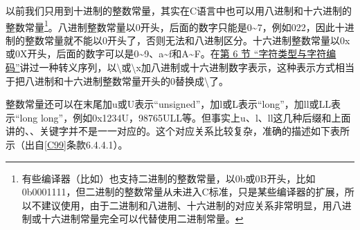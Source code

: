 以前我们只用到十进制的整数常量，其实在C语言中也可以用八进制和十六进制的整数常量\footnote[26]{有些编译器（比如）也支持二进制的整数常量，以0b或0B开头，比如0b0001111，但二进制的整数常量从未进入C标准，只是某些编译器的扩展，所以不建议使用，由于二进制和八进制、十六进制的对应关系非常明显，用八进制或十六进制常量完全可以代替使用二进制常量。}。八进制整数常量以0开头，后面的数字只能是0\textasciitilde{}\BookSplit{}7，例如022，因此十进制的整数常量就不能以0开头了，否则无法和八进制区分。十六进制整数常量以0x或0X开头，后面的数字可以是0\textasciitilde{}\BookSplit{}9、a\textasciitilde{}\BookSplit{}f和A\textasciitilde{}\BookSplit{}F。在\hyperlink{db.ch02s06.id2709590}{第 6 节 “字符类型与字符编码”}讲过一种转义序列，以\textbackslash{}或\textbackslash{}x加八进制或十六进制数字表示，这种表示方式相当于把八进制和十六进制整数常量开头的0替换成\textbackslash{}了。



整数常量还可以在末尾加u或U表示“unsigned”，加l或L表示“long”，加ll或LL表示“long long”，例如0x1234U，98765ULL等。但事实上u、l、ll这几种后缀和上面讲的、、关键字并不是一一对应的。这个对应关系比较复杂，准确的描述如下表所示（出自\hyperlink{db.bi01.bibli.c99}{[C99]}条款6.\BookSplit{}4.\BookSplit{}4.\BookSplit{}1）。



